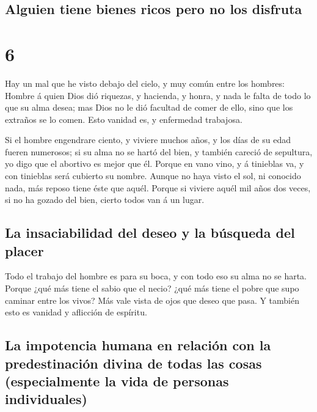 \hypertarget{alguien-tiene-bienes-ricos-pero-no-los-disfruta}{%
\subsection{Alguien tiene bienes ricos pero no los
disfruta}\label{alguien-tiene-bienes-ricos-pero-no-los-disfruta}}

\hypertarget{section-5}{%
\section{6}\label{section-5}}

 Hay un mal que he visto debajo del cielo, y muy común
entre los hombres:  Hombre á quien Dios dió riquezas, y
hacienda, y honra, y nada le falta de todo lo que su alma desea; mas
Dios no le dió facultad de comer de ello, sino que los extraños se lo
comen. Esto vanidad es, y enfermedad trabajosa.

 Si el hombre engendrare ciento, y viviere muchos años, y
los días de su edad fueren numerosos; si su alma no se hartó del bien, y
también careció de sepultura, yo digo que el abortivo es mejor que él.
 Porque en vano vino, y á tinieblas va, y con tinieblas
será cubierto su nombre.  Aunque no haya visto el sol, ni
conocido nada, más reposo tiene éste que aquél.  Porque si
viviere aquél mil años dos veces, si no ha gozado del bien, cierto todos
van á un lugar.

\hypertarget{la-insaciabilidad-del-deseo-y-la-buxfasqueda-del-placer}{%
\subsection{La insaciabilidad del deseo y la búsqueda del
placer}\label{la-insaciabilidad-del-deseo-y-la-buxfasqueda-del-placer}}

 Todo el trabajo del hombre es para su boca, y con todo
eso su alma no se harta.  Porque ¿qué más tiene el sabio
que el necio? ¿qué más tiene el pobre que supo caminar entre los vivos?
 Más vale vista de ojos que deseo que pasa. Y también esto
es vanidad y aflicción de espíritu.

\hypertarget{la-impotencia-humana-en-relaciuxf3n-con-la-predestinaciuxf3n-divina-de-todas-las-cosas-especialmente-la-vida-de-personas-individuales}{%
\subsection{La impotencia humana en relación con la predestinación
divina de todas las cosas (especialmente la vida de personas
individuales)}\label{la-impotencia-humana-en-relaciuxf3n-con-la-predestinaciuxf3n-divina-de-todas-las-cosas-especialmente-la-vida-de-personas-individuales}}

